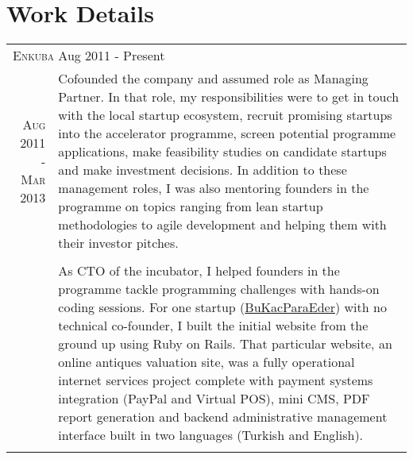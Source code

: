 \documentclass[a4paper,10pt]{article}
\newcommand{\exptitle}[2]{
  \multicolumn{2}{l}{\textsc{#1} \footnotesize{#2}} \\
  \specialrule{.01em}{0.5em}{1em}
}
\begin{document}
\section{Work Details}
\begin{longtable}{r|p{11cm}}
  \exptitle{Enkuba}{Aug 2011 - Present}

  \textsc{Aug 2011 - Mar 2013}  & Cofounded the company and assumed role as Managing Partner. In that role, my responsibilities were to get in touch with the local startup ecosystem, recruit promising startups into the accelerator programme, screen potential programme applications, make feasibility studies on candidate startups and make investment decisions. In addition to these management roles, I was also mentoring founders in the programme on topics ranging from lean startup methodologies to agile development and helping them with their investor pitches. \\
                                & \\
                                & As CTO of the incubator, I helped founders in the programme tackle programming challenges with hands-on coding sessions. For one startup (\href{http://www.bukacparaeder.com}{BuKacParaEder}) with no technical co-founder, I built the initial website from the ground up using Ruby on Rails. That particular website, an online antiques valuation site, was a fully operational internet services project complete with payment systems integration (PayPal and Virtual POS), mini CMS, PDF report generation and backend administrative management interface built in two languages (Turkish and English). \\
  \multicolumn{2}{c}{} \\


\end{longtable}
\end{document}
